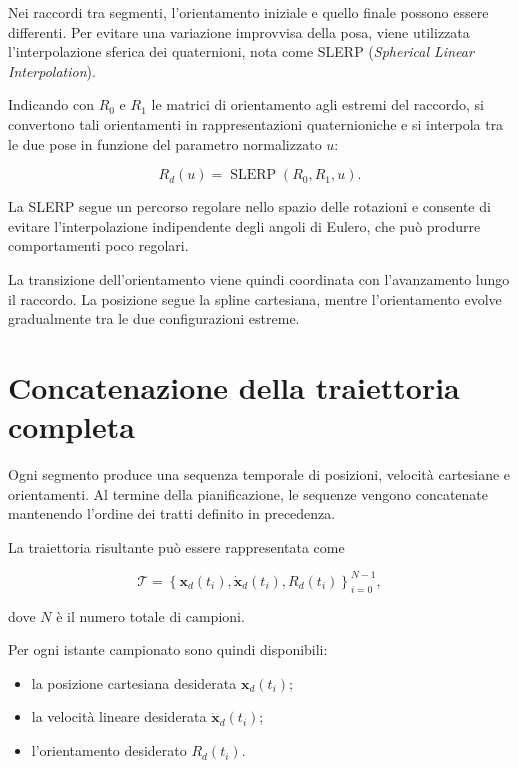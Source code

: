 Nei raccordi tra segmenti, l'orientamento iniziale e quello finale possono essere differenti. Per evitare una variazione improvvisa della posa, viene utilizzata l'interpolazione sferica dei quaternioni, nota come SLERP (\textit{Spherical Linear Interpolation}).

Indicando con $R_0$ e $R_1$ le matrici di orientamento agli estremi del raccordo, si convertono tali orientamenti in rappresentazioni quaternioniche e si interpola tra le due pose in funzione del parametro normalizzato $u$:

\begin{equation}
    R_d(u)=\operatorname{SLERP}(R_0,R_1,u).
\end{equation}

La SLERP segue un percorso regolare nello spazio delle rotazioni e consente di evitare l'interpolazione indipendente degli angoli di Eulero, che può produrre comportamenti poco regolari.

La transizione dell'orientamento viene quindi coordinata con l'avanzamento lungo il raccordo. La posizione segue la spline cartesiana, mentre l'orientamento evolve gradualmente tra le due configurazioni estreme.

\section{Concatenazione della traiettoria completa}

Ogni segmento produce una sequenza temporale di posizioni, velocità cartesiane e orientamenti. Al termine della pianificazione, le sequenze vengono concatenate mantenendo l'ordine dei tratti definito in precedenza.

La traiettoria risultante può essere rappresentata come

\begin{equation}
    \mathcal{T}=
    \left\{
    \mathbf{x}_d(t_i),
    \dot{\mathbf{x}}_d(t_i),
    R_d(t_i)
    \right\}_{i=0}^{N-1},
\end{equation}

dove $N$ è il numero totale di campioni.

Per ogni istante campionato sono quindi disponibili:
\begin{itemize}
    \item la posizione cartesiana desiderata $\mathbf{x}_d(t_i)$;
    \item la velocità lineare desiderata $\dot{\mathbf{x}}_d(t_i)$;
    \item l'orientamento desiderato $R_d(t_i)$.
\end{itemize}

